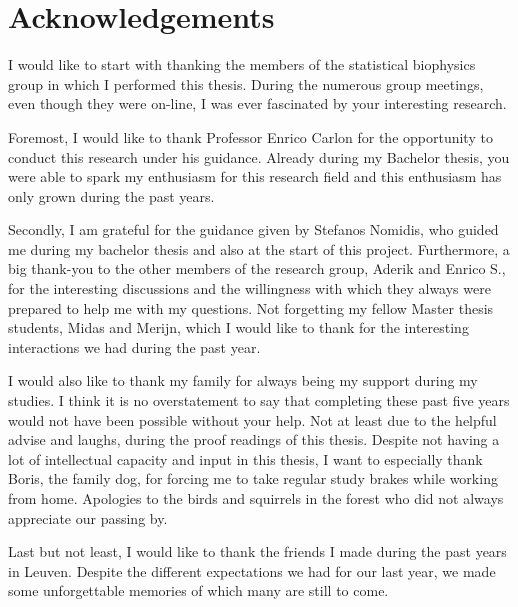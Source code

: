 \chapter*{Acknowledgements}

I would like to start with thanking the members of the statistical biophysics group in
which I performed this thesis. During the numerous group meetings, even though they were
on-line, I was ever fascinated by your interesting research.

Foremost, I would like to thank Professor Enrico Carlon for the opportunity to
conduct this research under his guidance. Already during my Bachelor
thesis, you were able to spark my enthusiasm for this research field and this enthusiasm
has only grown during the past years.

Secondly, I am grateful for the guidance given by Stefanos Nomidis, who guided me
during my bachelor thesis and also at the start of this project. Furthermore, a big
thank-you to the other members of the research group, Aderik and Enrico S., for the
interesting discussions and the willingness with which they always were prepared to help
me with my questions. Not forgetting my fellow Master thesis students, Midas and Merijn,
which I would like to thank for the interesting interactions we had during the past year.

I would also like to thank my family for always being my support during my
studies. I think it is no overstatement to say that completing these past five years
would not have been possible without your help. Not at least due to the helpful advise
and laughs, during the proof readings of this thesis. Despite not having a lot of
intellectual capacity and input in this thesis, I want to especially thank Boris, the
family dog, for forcing me to take regular study brakes while working from home.
Apologies to the birds and squirrels in the forest who did not always appreciate our
passing by.

Last but not least, I would like to thank the friends I made during the past years in
Leuven. Despite the different expectations we had for our last year, we made some
unforgettable memories of which many are still to come.
